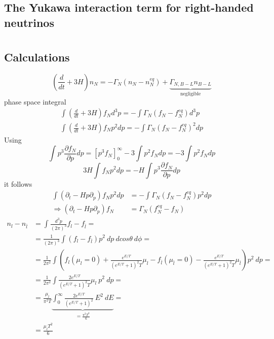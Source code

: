 \appendix
\chapter{}
\section{The Yukawa interaction term for right-handed neutrinos}
\chapter{}
\section{Calculations}
\begin{equation*}
(\frac{d}{dt}+3H)n_N=-\Gamma_N(n_N-n_N^{eq})+\underbrace{\Gamma_{N,B-L}n_{B-L}}_\text{negligible}
\end{equation*}
phase space integral
\begin{align*}
\int (\frac{d}{dt}+3H)f_Nd^3p=-\int\Gamma_N(f_N-f_N^{eq})d^3p\\
\int (\frac{d}{dt}+3H)f_Np^2dp=-\int\Gamma_N(f_N-f_N^{eq})^2dp
\end{align*}
Using
\begin{equation*}
\int p^3\frac{\partial f_N}{\partial p}dp=\left[p^3f_N\right]_0^\infty-3\int p^2f_Ndp=-3\int p^2f_Ndp
\end{equation*}
\begin{equation*}
3H\int f_Np^2dp=-H\int p^3\frac{\partial f_N}{\partial p}dp
\end{equation*}
it follows
\begin{align*}
\int (\partial_t-Hp\partial_p)f_Np^2dp&=-\int\Gamma_N(f_N-f_N^{eq})p^2dp\\
\Rightarrow (\partial_t-Hp\partial_p)f_N&=\Gamma_N(f_N^{eq}-f_N)
\end{align*}
\newpage
\begin{align*}
	n_l-n_{\bar{l}}&=\int\frac{d^3p}{(2\pi)^3}f_l-f_{\bar{l}}=\\
	&=\frac{1}{(2\pi)^3}\int (f_l-f_{\bar{l}})p^2\:dp\:dcos\theta \:d\phi=\\
	&=\frac{1}{2\pi^2}\int\left(f_l(\mu_l=0)+\frac{e^{E/T}}{(e^{E/T}+1)^2T}\mu_l-f_{\bar{l}}(\mu_{\bar{l}}=0)-\frac{e^{E/T}}{(e^{E/T}+1)^2T}\mu_{\bar{l}}\right)p^2\:dp=\\
	&=\frac{1}{2\pi^2}\int\frac{2e^{E/T}}{(e^{E/T}+1)^2T}\mu_l\:p^2\:dp=\\
	&=\frac{\mu_l}{\pi^2T}\underbrace{\int_{0}^{\infty}\frac{2e^{E/T}}{(e^{E/T}+1)^2}\:E^2\:dE}_{=\frac{\pi^2T^3}{6}}=\\
	&=\frac{\mu_lT^2}{6}
\end{align*}
